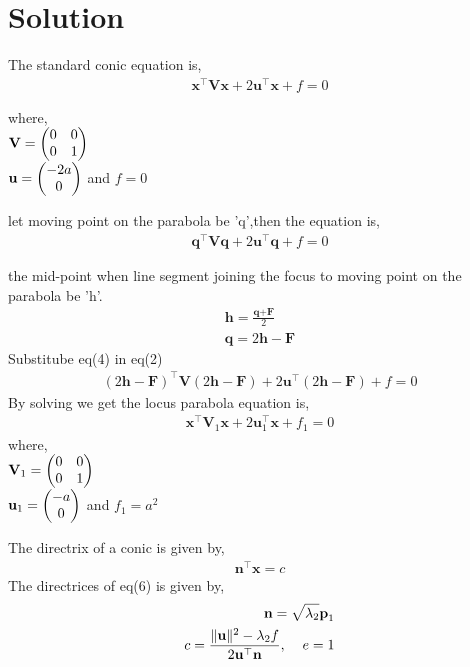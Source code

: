  \section{Solution}
The standard conic equation is,\\
\begin{align}
\textbf{x}^\top\textbf{Vx}+2\textbf{u}^\top\textbf{x}+f=0
\end{align} 
\raggedright where,\\
\centering
$\textbf{V}=\begin{pmatrix}0&0 \\0&1\end{pmatrix}$\\ $\textbf{u}=\begin{pmatrix}-2a\\0\end{pmatrix}$ and $f=0$ \\
\raggedright
let moving point on the parabola be 'q',then the equation is,
\begin{align}
\textbf{q}^\top\textbf{Vq}+2\textbf{u}^\top\textbf{q}+f=0
\end{align}
\raggedright
the mid-point when line segment joining the focus to moving point on the parabola be 'h'.
\begin{align}
\textbf{h}=\frac{\textbf{q+F}}{2}\\
\textbf{q}=2\textbf{h}-\textbf{F}
\end{align}
Substitube eq(4) in eq(2)\\
\begin{align}
(2\textbf{h}-\textbf{F})^\top\textbf{V}(2\textbf{h}-\textbf{F})+2\textbf{u}^\top(2\textbf{h}-\textbf{F})+f=0
\end{align}
By solving we get the locus parabola equation is, \\
\begin{align}
\textbf{x}^\top\textbf{V}_{1}\textbf{x}+2\textbf{u}_{1}^\top\textbf{x}+f_1=0
\end{align} 
where,\\
\centering
$\textbf{V}_{1}=\begin{pmatrix}0&0 \\0&1\end{pmatrix}$\\ $\textbf{u}_{1}=\begin{pmatrix}-a\\0\end{pmatrix}$ and $f_1=a^2$ \\
\raggedright
The directrix of a conic is given by,
\begin{align}
\textbf{n}^\top\textbf{x}=c
\end{align}
The directrices of eq(6) is given by,\\
\begin{align}
\textbf{n}=\sqrt{\lambda_2}\textbf{p}_{1}\\
c=\frac{\|\textbf{u}\|^2-\lambda_2 f}{2\textbf{u}^\top\textbf{n}} , \hspace{0.4cm} e=1
\end{align}
